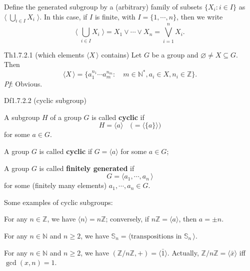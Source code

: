 \documentclass{article}
\begin{document}
\begin{Rmk}{}
    \textcolor{Df}{Define the generated subgroup by a (arbitrary) family of subsets $\{X_i: i\in I\}$ as $\langle\; \bigcup_{i\in I} X_i\;\rangle$. In this case, if $I$ is finite, with $I = \{1, \cdots, n\}$, then we write
    $$ \langle\; \bigcup_{i\in I} X_i\;\rangle = X_1\vee\cdots\vee X_n = \bigvee_{i=1}^n X_i. $$}
\end{Rmk}

\begin{Th}{Th1.7.2.1 (which elements $\langle X\,\rangle$ contains)}
    Let $G$ be a group and $\varnothing\neq X\subseteq G$. Then
    $$ \langle X\,\rangle = \Big\{a_1^{n_1}\cdots a_m^{n_m}: \quad m\in\mathbb{N}^\ast, a_i\in X, n_i\in\mathbb{Z}\Big\}. $$
    \tcblower
    \textit{Pf}: Obvious.
\end{Th}

\begin{Df}{Df1.7.2.2 (cyclic subgroup)}
    \begin{compactenum}
        \item A subgroup $H$ of a group $G$ is called \textbf{cyclic} if 
        $$ H = \langle a\rangle \quad \Big( = \langle \{a\} \rangle \Big) $$
        for some $a\in G$. 
        \item A group $G$ is called \textbf{cyclic} if $G = \langle a\rangle$ for some $a\in G$;
        \item A group $G$ is called \textbf{finitely generated} if 
        $$ G = \langle a_1, \cdots, a_n\,\rangle $$
        for some (finitely many elements) $a_1, \cdots, a_n\in G$.
    \end{compactenum}
\end{Df}

\begin{Rmk}{}
    \textcolor{Th}{Some examples of cyclic subgroups:
    \begin{compactenum}
        \item For any $n\in\mathbb{Z}$, we have $\langle n\rangle = n\mathbb{Z}$; conversely, if $n\mathbb{Z} = \langle a\rangle$, then $a = \pm n$.
        \item For any $n\in\mathbb{N}$ and $n\geq 2$, we have $\mathbb{S}_n = \langle \text{transpositions in }\mathbb{S}_n\,\rangle$.
        \item For any $n\in\mathbb{N}$ and $n\geq 2$, we have $(\mathbb{Z}/n\mathbb{Z}, +) = \langle \bar{1}\rangle$. Actually, $\mathbb{Z}/n\mathbb{Z} = \langle \bar{x}\rangle$ iff $\gcd(x, n) = 1$.
    \end{compactenum}}
\end{Rmk}
\end{document}
